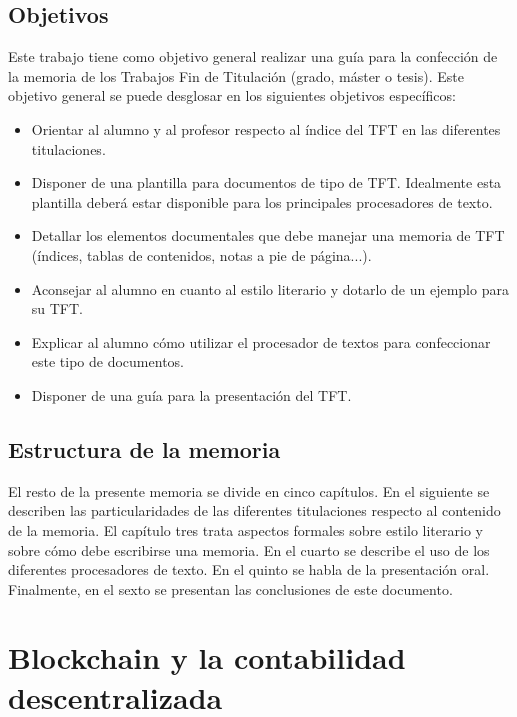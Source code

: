 \documentclass[12pt,spanish,chapterprefix, numbers=noenddot]{book}
\numberwithin{equation}{section}
\numberwithin{figure}{section}
\begin{document}
    \section{Objetivos}

    Este trabajo tiene como objetivo general realizar una guía para la
    confección de la memoria de los Trabajos Fin de Titulación (grado,
    máster o tesis). Este objetivo general se puede desglosar en los siguientes
    objetivos específicos:
    \begin{itemize}
        \item Orientar al alumno y al profesor respecto al índice del TFT en las
        diferentes titulaciones.
        \item Disponer de una plantilla para documentos de tipo de TFT. Idealmente
        esta plantilla deberá estar disponible para los principales procesadores
        de texto.
        \item Detallar los elementos documentales que debe manejar una memoria de
        TFT (índices, tablas de contenidos, notas a pie de página...).
        \item Aconsejar al alumno en cuanto al estilo literario y dotarlo de un
        ejemplo para su TFT.
        \item Explicar al alumno cómo utilizar el procesador de textos para confeccionar
        este tipo de documentos.
        \item Disponer de una guía para la presentación del TFT.
    \end{itemize}

    \section{Estructura de la memoria}

    El resto de la presente memoria se divide en cinco capítulos. En el
    siguiente se describen las particularidades de las diferentes titulaciones
    respecto al contenido de la memoria. El capítulo tres trata aspectos
    formales sobre estilo literario y sobre cómo debe escribirse una memoria.
    En el cuarto se describe el uso de los diferentes procesadores de
    texto. En el quinto se habla de la presentación oral. Finalmente,
    en el sexto se presentan las conclusiones de este documento.

    \chapter{Blockchain y la contabilidad descentralizada}
\end{document}

